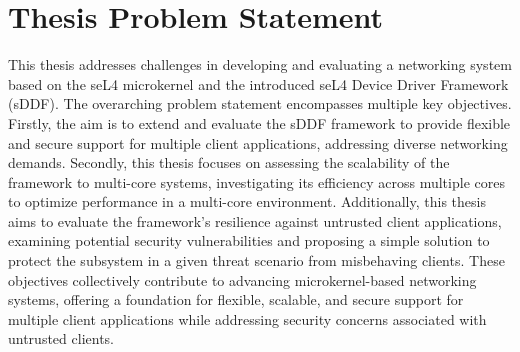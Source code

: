 \section{Thesis Problem Statement}
This thesis addresses challenges in developing and evaluating a networking system based on 
the seL4 microkernel and the introduced seL4 Device Driver Framework (sDDF). The overarching 
problem statement encompasses multiple key objectives. Firstly, the aim is to extend and evaluate 
the sDDF framework to provide flexible and secure support for multiple client applications, 
addressing diverse networking demands. Secondly, this thesis focuses on assessing the scalability 
of the framework to multi-core systems, investigating its efficiency across multiple cores to 
optimize performance in a multi-core environment. Additionally, this thesis aims to evaluate the 
framework's resilience against untrusted client applications, examining potential security vulnerabilities 
and proposing a simple solution to protect the subsystem in a given threat scenario from misbehaving clients. 
These objectives collectively contribute to advancing microkernel-based networking systems, offering
a foundation for flexible, scalable, and secure support for multiple client applications while addressing
security concerns associated with untrusted clients. 

